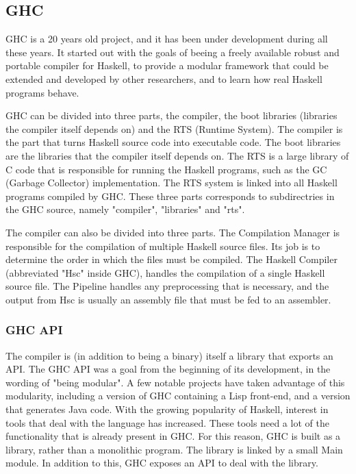 


\subsection{GHC}

GHC is a 20 years old project, and it has been under development during
all these years. It started out with the goals of beeing a freely available
robust and portable compiler for Haskell, to provide a modular framework that
could be extended and developed by other researchers, and to learn how real
Haskell programs behave. \cite{marlow2012glasgow}

GHC can be divided into three parts, the compiler, the boot libraries
(libraries the compiler itself depends on) and the RTS (Runtime System). 
The compiler is the part
that turns Haskell source code into executable code. The boot libraries are the 
libraries that the compiler itself depends on. The RTS is a large library
of C code that is responsible for running the Haskell programs, such as the 
GC (Garbage Collector) implementation. The RTS system is linked into all 
Haskell programs compiled by GHC. These three parts corresponds to subdirectries
in the GHC source, namely "compiler", "libraries" and "rts".
\cite{marlow2012glasgow}

The compiler can also be divided into three parts. The Compilation Manager is 
responsible for the compilation of multiple Haskell source files. Its job is to
determine the order in which the files must be compiled. The Haskell Compiler 
(abbreviated "Hsc" inside GHC), handles the compilation of a single Haskell source
file. The Pipeline handles any preprocessing that is necessary, and the output
from Hsc is usually an assembly file that must be fed to an assembler.
\cite{marlow2012glasgow}


\subsubsection{GHC API}

The compiler is (in addition to being a binary) itself a library that exports an API.
The GHC API was a goal from the beginning of its development, in the wording of
"being modular". A few notable projects have taken advantage of this modularity,
including a version of GHC containing a Lisp front-end, and a version that generates
Java code. With the growing popularity of Haskell, interest in tools that deal with
the language has increased. These tools need a lot of the functionality that is already
present in GHC. For this reason, GHC is built as a library, rather than a monolithic
program. The library is linked by a small Main module. In addition to this, GHC
exposes an API to deal with the library.\cite{marlow2012glasgow} 

